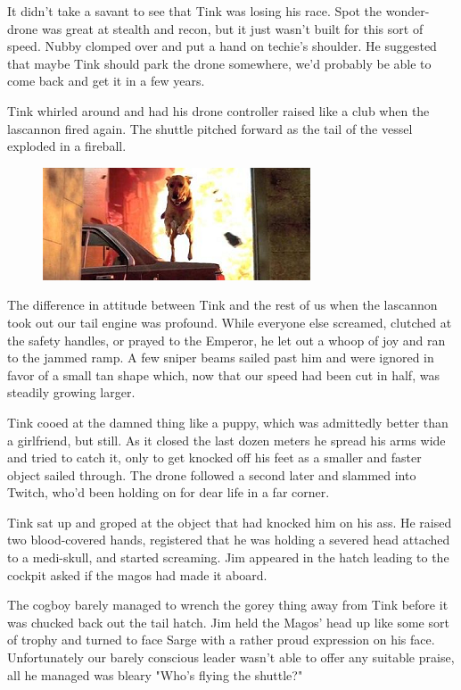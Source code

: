 It didn't take a savant to see that Tink was losing his race. 
Spot the wonder-drone was great at stealth and recon, but it just wasn't built for this sort of speed. 
Nubby clomped over and put a hand on techie's shoulder. 
He suggested that maybe Tink should park the drone somewhere, we'd probably be able to come back and get it in a few years.

Tink whirled around and had his drone controller raised like a club when the lascannon fired again. 
The shuttle pitched forward as the tail of the vessel exploded in a fireball.

\begin{figure}
	\begin{center}
		\includegraphics[width=\figwidth]{pics/11/28.png}
	\end{center}
\end{figure}
The difference in attitude between Tink and the rest of us when the lascannon took out our tail engine was profound. 
While everyone else screamed, clutched at the safety handles, or prayed to the Emperor, he let out a whoop of joy and ran to the jammed ramp. 
A few sniper beams sailed past him and were ignored in favor of a small tan shape which, now that our speed had been cut in half, was steadily growing larger.

Tink cooed at the damned thing like a puppy, which was admittedly better than a girlfriend, but still. 
As it closed the last dozen meters he spread his arms wide and tried to catch it, only to get knocked off his feet as a smaller and faster object sailed through. 
The drone followed a second later and slammed into Twitch, who'd been holding on for dear life in a far corner.

Tink sat up and groped at the object that had knocked him on his ass. 
He raised two blood-covered hands, registered that he was holding a severed head attached to a medi-skull, and started screaming. 
Jim appeared in the hatch leading to the cockpit asked if the magos had made it aboard. 


The cogboy barely managed to wrench the gorey thing away from Tink before it was chucked back out the tail hatch. 
Jim held the Magos' head up like some sort of trophy and turned to face Sarge with a rather proud expression on his face. 
Unfortunately our barely conscious leader wasn't able to offer any suitable praise, all he managed was bleary "Who's flying the shuttle?"

